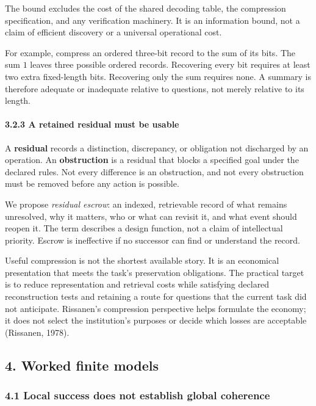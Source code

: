 \documentclass[
  10pt,
]{article}
\begin{document}
The bound excludes the cost of the shared decoding table, the compression specification, and any verification machinery. It is an information bound, not a claim of efficient discovery or a universal operational cost.

For example, compress an ordered three-bit record to the sum of its bits. The sum \protect\hypertarget{math-E0040-0051}{}{\(1\)} leaves three possible ordered records. Recovering every bit requires at least two extra fixed-length bits. Recovering only the sum requires none. A summary is therefore adequate or inadequate relative to questions, not merely relative to its length.

\paragraph{3.2.3 A retained residual must be usable}\label{a-retained-residual-must-be-usable}

A \textbf{residual} records a distinction, discrepancy, or obligation not discharged by an operation. An \textbf{obstruction} is a residual that blocks a specified goal under the declared rules. Not every difference is an obstruction, and not every obstruction must be removed before any action is possible.

We propose \emph{residual escrow}: an indexed, retrievable record of what remains unresolved, why it matters, who or what can revisit it, and what event should reopen it. The term describes a design function, not a claim of intellectual priority. Escrow is ineffective if no successor can find or understand the record.

Useful compression is not the shortest available story. It is an economical presentation that meets the task's preservation obligations. The practical target is to reduce representation and retrieval costs while satisfying declared reconstruction tests and retaining a route for questions that the current task did not anticipate. Rissanen's compression perspective helps formulate the economy; it does not select the institution's purposes or decide which losses are acceptable (Rissanen, 1978).

\subsection{4. Worked finite models}\label{worked-finite-models}

\subsubsection{4.1 Local success does not establish global coherence}\label{local-success-does-not-establish-global-coherence}
\end{document}
